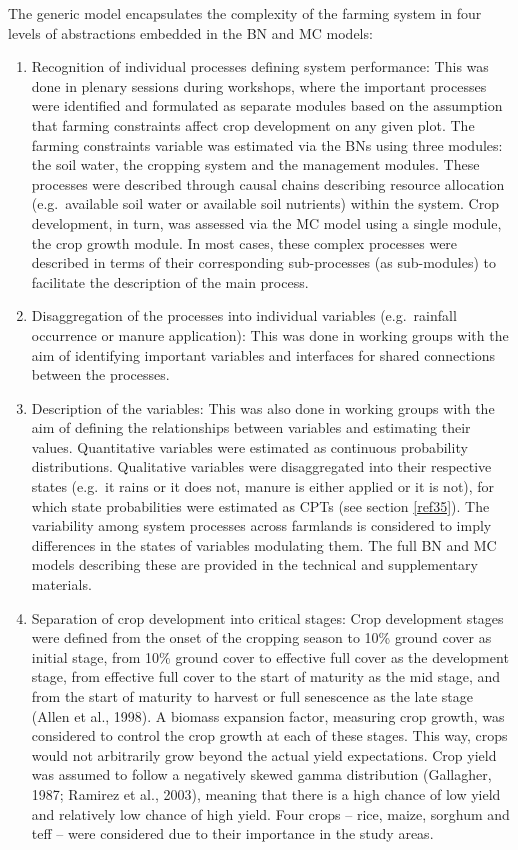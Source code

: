 \documentclass[]{elsarticle} %
\begin{document}
The generic model encapsulates the complexity of the farming system in four levels of abstractions embedded in the BN and MC models:

\begin{enumerate}
\def\labelenumi{\arabic{enumi}.}
\item
  Recognition of individual processes defining system performance: This was done in plenary sessions during workshops, where the important processes were identified and formulated as separate modules based on the assumption that farming constraints affect crop development on any given plot. The farming constraints variable was estimated via the BNs using three modules: the soil water, the cropping system and the management modules. These processes were described through causal chains describing resource allocation (e.g.~available soil water or available soil nutrients) within the system. Crop development, in turn, was assessed via the MC model using a single module, the crop growth module. In most cases, these complex processes were described in terms of their corresponding sub-processes (as sub-modules) to facilitate the description of the main process.
\item
  Disaggregation of the processes into individual variables (e.g.~rainfall occurrence or manure application): This was done in working groups with the aim of identifying important variables and interfaces for shared connections between the processes.
\item
  Description of the variables: This was also done in working groups with the aim of defining the relationships between variables and estimating their values. Quantitative variables were estimated as continuous probability distributions. Qualitative variables were disaggregated into their respective states (e.g.~it rains or it does not, manure is either applied or it is not), for which state probabilities were estimated as CPTs (see section \ref{ref35}). The variability among system processes across farmlands is considered to imply differences in the states of variables modulating them. The full BN and MC models describing these are provided in the technical and supplementary materials.
\item
  Separation of crop development into critical stages: Crop development stages were defined from the onset of the cropping season to 10\% ground cover as initial stage, from 10\% ground cover to effective full cover as the development stage, from effective full cover to the start of maturity as the mid stage, and from the start of maturity to harvest or full senescence as the late stage (Allen et al., 1998). A biomass expansion factor, measuring crop growth, was considered to control the crop growth at each of these stages. This way, crops would not arbitrarily grow beyond the actual yield expectations. Crop yield was assumed to follow a negatively skewed gamma distribution (Gallagher, 1987; Ramirez et al., 2003), meaning that there is a high chance of low yield and relatively low chance of high yield. Four crops -- rice, maize, sorghum and teff -- were considered due to their importance in the study areas.
\end{enumerate}
\end{document}
